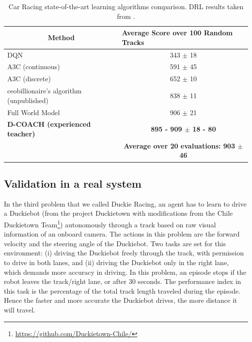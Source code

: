 \begin{table}[t]
\centering
\caption{Car Racing state-of-the-art learning algorithms comparison. DRL results taken from \cite{Ha2018}.}
\label{CarRacing_table}
\begin{tabular}{lc}
\multicolumn{1}{c}{\textbf{Method}}      & \multicolumn{1}{l}{\textbf{Average Score over 100 Random Tracks}} \\ \hline\hline
DQN                                      & 343 $\pm$ 18                                                      \\ \hline
A3C (continuous)                         & 591 $\pm$ 45                                                      \\ \hline
A3C (discrete)                           & 652 $\pm$ 10                                                      \\ \hline
ceobillionaire’s algorithm (unpublished) & 838 $\pm$ 11                                                      \\ \hline
Full World Model                         & 906 $\pm$ 21                                                      \\ \hline
\textbf{D-COACH (experienced teacher)}                         & \textbf{895 - 909 $\pm$ 18 - 80} \\
& \textbf{Average over 20 evaluations: 903 $\pm$ 46}
\\ \hline
\end{tabular}
\end{table}

\subsection{Validation in a real system}
In the third problem that we called Duckie Racing, an agent has to learn to drive a Duckiebot (from the project  Duckietown \cite{Paull2017} with modifications from the Chile Duckietown Team\footnote{\url{https://github.com/Duckietown-Chile/}}) autonomously through a track based on raw visual information of an onboard camera. The actions in this problem are the forward velocity and the steering angle of the Duckiebot. Two tasks are set for this environment: (i) driving the Duckiebot freely through the track, with permission to drive in both lanes, and (ii) driving the Duckiebot only in the right lane, which demands more accuracy in driving. In this problem, an episode stops if the robot leaves the track/right lane, or after 30 seconds. The performance index in this task is the percentage of the total track length traveled during the episode. Hence the faster and more accurate the Duckiebot drives, the more distance it will travel.

